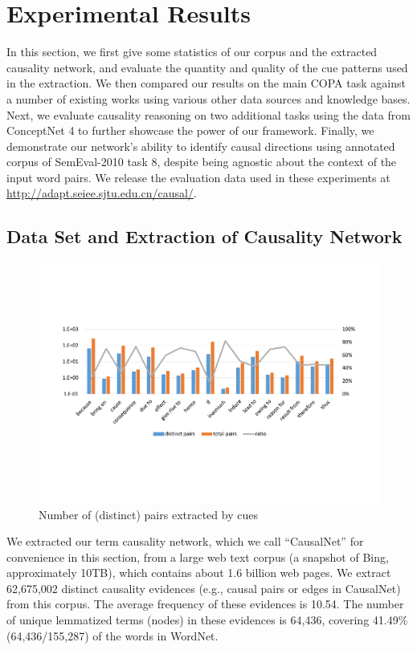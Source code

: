 \documentclass[letterpaper]{article}
\begin{document}
% 
\section{Experimental Results}
\label{sec:eval}
In this section, we first give some statistics of
our corpus and the extracted causality network, and evaluate the
quantity and quality of the cue patterns used in the extraction.
We then compared our results on the main COPA task against a number of
existing works using various other data sources and knowledge bases.
Next, we evaluate causality reasoning
on two additional tasks using the data from ConceptNet 4 to
further showcase the power of our framework.
Finally, we demonstrate our network's ability to identify causal directions
using annotated corpus of SemEval-2010 task 8, despite being
agnostic about the context of the input word pairs.
We release the evaluation data used in these experiments
at \url{http://adapt.seiee.sjtu.edu.cn/causal/}.

\subsection{Data Set and Extraction of Causality Network}
\label{sec:causalnet}
\begin{figure}[th]
\centering
\includegraphics[width=1.6\columnwidth]{pattern1}
\caption{Number of (distinct) pairs extracted by cues}
\label{fig:pattern1}
\end{figure}
We extracted our term causality network, which we call ``CausalNet''
for convenience in this section, from a large web text corpus (a snapshot of Bing, approximately 10TB), %
which contains about 1.6 billion web pages.
We extract 62,675,002 distinct causality evidences (e.g., causal pairs
or edges in CausalNet) from this corpus.
The average frequency of these evidences is 10.54.
The number of unique lemmatized terms (nodes)
in these evidences is 64,436, covering 41.49\% (64,436/155,287) of the
words in WordNet.
\end{document}
